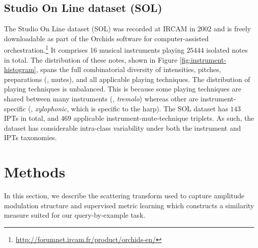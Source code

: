 \subsection{Studio On Line dataset (SOL)}
The Studio On Line dataset (SOL) was recorded at IRCAM in 2002 and is freely downloadable as part of the Orchids software for computer-assisted orchestration.\footnote{\url{http://forumnet.ircam.fr/product/orchids-en/}}
It comprises 16 musical instruments playing $25444$ isolated notes in total.
The distribution of these notes, shown in Figure \ref{fig:instrument-histogram}, spans the full combinatorial diversity of intensities, pitches, preparations (\ie{}, mutes), and all applicable playing techniques.
The distribution of playing techniques is unbalanced.
This is because some playing techniques are shared between many instruments (\eg{}, \textit{tremolo}) whereas other are instrument-specific (\eg{}, \textit{xylophonic}, which is specific to the harp).
The SOL dataset has $143$ IPTs in total, and $469$ applicable instrument-mute-technique triplets.
As such, the dataset has considerable intra-class variability under both the instrument and IPTs taxonomies.







\section{Methods}

In this section, we describe the scattering transform used to capture amplitude modulation structure and supervised metric learning which constructs a similarity measure suited for our query-by-example task.

